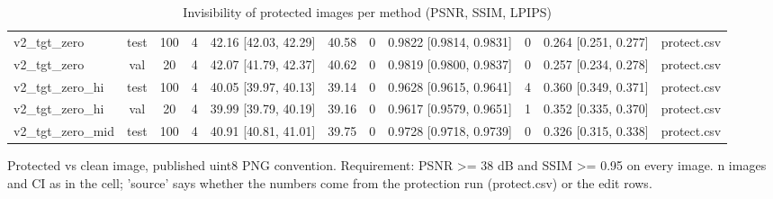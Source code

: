 \begin{table}[t]
{\begin{tabular}{lcccccccccc}
v2\_tgt\_zero & test & 100 & 4 & 42.16 [42.03, 42.29] & 40.58 & 0 & 0.9822 [0.9814, 0.9831] & 0 & 0.264 [0.251, 0.277] & protect.csv \\
v2\_tgt\_zero & val & 20 & 4 & 42.07 [41.79, 42.37] & 40.62 & 0 & 0.9819 [0.9800, 0.9837] & 0 & 0.257 [0.234, 0.278] & protect.csv \\
v2\_tgt\_zero\_hi & test & 100 & 4 & 40.05 [39.97, 40.13] & 39.14 & 0 & 0.9628 [0.9615, 0.9641] & 4 & 0.360 [0.349, 0.371] & protect.csv \\
v2\_tgt\_zero\_hi & val & 20 & 4 & 39.99 [39.79, 40.19] & 39.16 & 0 & 0.9617 [0.9579, 0.9651] & 1 & 0.352 [0.335, 0.370] & protect.csv \\
v2\_tgt\_zero\_mid & test & 100 & 4 & 40.91 [40.81, 41.01] & 39.75 & 0 & 0.9728 [0.9718, 0.9739] & 0 & 0.326 [0.315, 0.338] & protect.csv \\
\bottomrule
\end{tabular}
}
\caption{Invisibility of protected images per method (PSNR, SSIM, LPIPS)}
\label{tab:invisibility_methods}
\par\footnotesize Protected vs clean image, published uint8 PNG convention. Requirement: PSNR >= 38 dB and SSIM >= 0.95 on every image. n images and CI as in the cell; 'source' says whether the numbers come from the protection run (protect.csv) or the edit rows.
\end{table}
